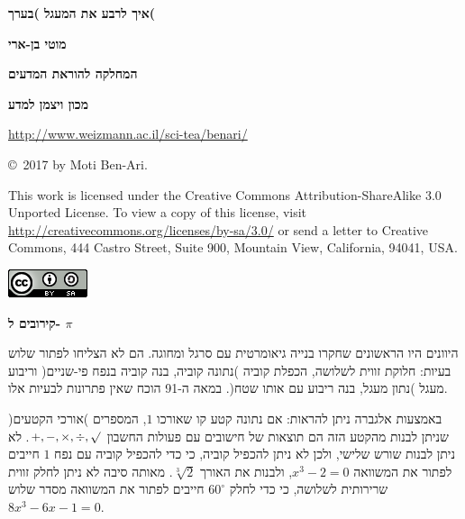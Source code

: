 \documentclass[12pt,a4paper]{article}
\begin{document}
\thispagestyle{empty}


\begin{center}
\textbf{\Huge%
 איך לרבע את המעגל )בערך(
}

\bigskip

\bigskip

\textbf{\Large מוטי בן-ארי}

\bigskip

\textbf{\Large המחלקה להוראת המדעים}

\bigskip

\textbf{\Large מכון ויצמן למדע}

\bigskip

\url{http://www.weizmann.ac.il/sci-tea/benari/}
\end{center}

\bigskip
\bigskip

\begin{center}
\copyright{}\  2017 by Moti Ben-Ari.

\end{center}


{\small This work is licensed under the Creative Commons Attribution-ShareAlike 3.0 Unported License. To view a copy of this license, visit \url{http://creativecommons.org/licenses/by-sa/3.0/} or send a letter to Creative Commons, 444 Castro Street, Suite 900, Mountain View, California, 94041, USA.}

\bigskip

\begin{center}
\includegraphics[width=.2\textwidth]{../by-sa.png}
\end{center}


\newpage

\begin{center}
\textbf{\Large%
קירובים ל-%
$\pi$}
\end{center}

היוונים היו הראשונים שחקרו בנייה גיאומרטית עם סרגל ומחוגה. הם לא הצליחו לפתור שלוש בעיות: חלוקת זווית לשלושה, הכפלת קוביה )נתונה קוביה, בנה קוביה בנפח פי-שניים( וריבוע מעגל )נתון מעגל, בנה ריבוע עם אותו שטח(. במאה ה-91 הוכח שאין פתרונות לבעיות אלו.

באמצעות אלגברה ניתן להראות: אם נתונה קטע קו שאורכו
$1$,
המספרים )אורכי הקטעים( שניתן לבנות מהקטע הזה הם תוצאות של חישובים עם פעולות החשבון
$+,-,\times,\div,\surd$.
לא ניתן לבנות שורש שלישי, ולכן לא ניתן להכפיל קוביה, כי כדי להכפיל קוביה עם נפח 
$1$
חייבים לפתור את המשוואה
$x^3-2=0$,
ולבנות את האורך
$\sqrt[3]{2}$.
מאותה סיבה לא ניתן לחלק זווית שרירותית לשלושה, כי כדי לחלק 
$60^\circ$
חייבים לפתור את המשוואה מסדר שלוש
$8x^3-6x-1=0$.
\end{document}
